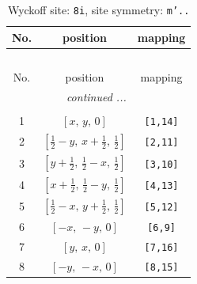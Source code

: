 \documentclass[fleqn,8pt]{jsarticle}
\begin{document}
\renewcommand{\arraystretch}{1.2}
\begin{longtable}{ccc}
\caption{Wyckoff site: {\tt 8i}, site symmetry: {\tt m'..}}
 \\
 \hline \hline
No. & position & mapping \\ \hline \endfirsthead

\multicolumn{2}{l}{\tablename\ \thetable{}} \\
 \hline \hline
No. & position & mapping \\ \hline \endhead

 \hline \hline
\multicolumn{2}{r}{\footnotesize\it continued ...} \\ \endfoot

 \hline \hline
\multicolumn{2}{r}{} \\ \endlastfoot

1 & $\left[ x,\, y,\, 0 \right]$ & {\tt [1,14]} \\ \hline
2 & $\left[ \frac{1}{2} - y,\, x + \frac{1}{2},\, \frac{1}{2} \right]$ & {\tt [2,11]} \\ \hline
3 & $\left[ y + \frac{1}{2},\, \frac{1}{2} - x,\, \frac{1}{2} \right]$ & {\tt [3,10]} \\ \hline
4 & $\left[ x + \frac{1}{2},\, \frac{1}{2} - y,\, \frac{1}{2} \right]$ & {\tt [4,13]} \\ \hline
5 & $\left[ \frac{1}{2} - x,\, y + \frac{1}{2},\, \frac{1}{2} \right]$ & {\tt [5,12]} \\ \hline
6 & $\left[ - x,\, - y,\, 0 \right]$ & {\tt [6,9]} \\ \hline
7 & $\left[ y,\, x,\, 0 \right]$ & {\tt [7,16]} \\ \hline
8 & $\left[ - y,\, - x,\, 0 \right]$ & {\tt [8,15]} \\
\end{longtable}
\renewcommand{\arraystretch}{1.2}
\end{document}
